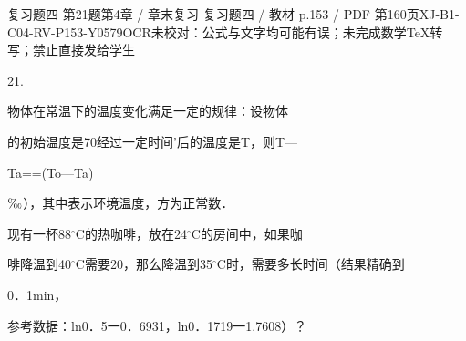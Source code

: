 \begin{bankitem}{复习题四 第21题}{第4章 / 章末复习 复习题四 / 教材 p.153 / PDF 第160页}{XJ-B1-C04-RV-P153-Y0579}{OCR未校对：公式与文字均可能有误；未完成数学TeX转写；禁止直接发给学生}
\begin{ocrdraft}
\par
21.
\par
物体在常温下的温度变化满足一定的规律：设物体
\par
的初始温度是70经过一定时间'后的温度是T，则T—
\par
Ta==(To—Ta)
\par
\ensuremath{\text{\textperthousand}}），其中表示环境温度，方为正常数．
\par
现有一杯88\ensuremath{{}^\circ\mathrm C}的热咖啡，放在24\ensuremath{{}^\circ\mathrm C}的房间中，如果咖
\par
啡降温到40\ensuremath{{}^\circ\mathrm C}需要20，那么降温到35\ensuremath{{}^\circ\mathrm C}时，需要多长时间（结果精确到
\par
0．1min，
\par
参考数据：ln0．5一0．6931，ln0．1719一1.7608）？
\end{ocrdraft}
\end{bankitem}
